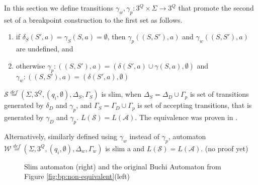 \documentclass[
	digital
nolof, nolot
]{fithesis3}
\newcommand{\cA}{\mathcal{A}}
\newcommand{\cS}{\mathcal{S}}
\newcommand{\lA}{L(\cA)}
\newcommand{\lS}{L(\cS)}
\newcommand{\eqdef}{\overset{def}{=}}
\newcommand{\flushed}{\text{\emoji{flushed}}}
\newcommand{\hell}{\text{\emoji{fire}}}
\newcommand{\heaven}{\text{\emoji{innocent}}}
\begin{document}
			In this section we define transitions  $\gamma_w, \gamma_p:3^Q \times \Sigma \rightarrow 3^Q$ that promote the second set of a breakpoint construction to the first set as follows. 
			
			\begin{enumerate}
				\item if $\delta_S(S',a) = \gamma_S(S, a) = \emptyset$, then $\gamma_{p}((S,S'), a)$ and $\gamma_{w}((S,S'), a)$ are undefined, and
				\item otherwise
				$\gamma_{p}:((S,S'),a)=(\delta(S',a)\cup\gamma(S, a),\emptyset)$ and $\gamma_{w}:((S,S'),a)=(\delta(S',a),\emptyset)$
			\end{enumerate}
			
			
			$\cS\eqdef(\Sigma, 3^Q, (q_i,\emptyset), \Delta_S ,\Gamma_S)$ is slim, when
			$\Delta_S=\Delta_D \cup \Gamma_p$ is set of transitions generated by $\delta_D$ and $\gamma_p$, and
			$\Gamma_S=\Gamma_D \cup \Gamma_p$ is set of accepting transitions, that is generated by $\gamma_D$ and $\gamma_p$. $\lS = \lA$. The equivalence was proven in \cite{hlavni}.
			
			Alternatively, similarly defined using $\gamma_w$ instead of $\gamma_{p}$, automaton $\mathcal{W}\eqdef(\Sigma, 3^Q, (q_i,\emptyset), \Delta_w, \Gamma_w)$ is slim a and $\lS=\lA$. (no proof yet)
			
			\begin{figure}[ht]
				\begin{center}
				\end{center}
				\caption{Slim automaton (right) and the original Buchi Automaton from Figure \ref{fig:bp:non-equivalent}(left)}
				\label{fig:slim:equivalent}
			\end{figure}
\end{document}
